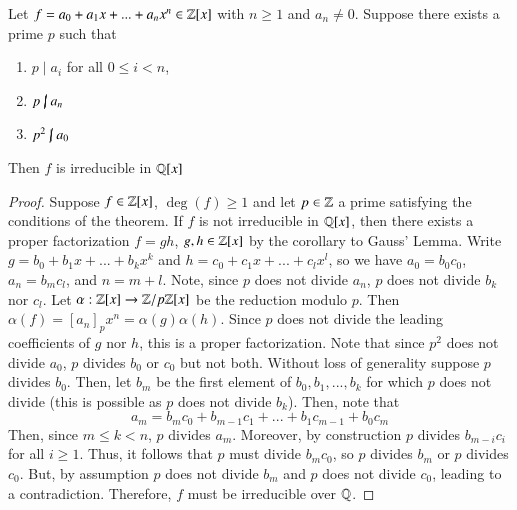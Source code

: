 \documentclass[12pt, a4paper, oneside, openright, titlepage]{book}
\begin{document}
\begin{namthm}
    Let $f = a_0+a_1x+...+a_nx^n \in \mathbb Z[x]$ with $n \geq 1$ and $a_n \neq 0$. Suppose there exists a prime $p$ such that \begin{enumerate}
        \item $p\;\vert\;a_i$ for all $0 \leq i < n$,
        \item $p\;\cancel{\vert}\;a_n$
        \item $p^2\;\cancel{\vert}\;a_0$
    \end{enumerate}
    Then $f$ is irreducible in $\mathbb Q[x]$
\end{namthm}
\begin{proof}
    Suppose $f \in \mathbb Z[x]$, $\deg(f) \geq 1$ and let $p \in \mathbb Z$ a prime satisfying the conditions of the theorem. If $f$ is not irreducible in $\mathbb Q[x]$, then there exists a proper factorization $f = gh$, $g,h \in \mathbb Z[x]$ by the corollary to Gauss' Lemma. Write $g = b_0+b_1x+...+b_kx^k$ and $h = c_0+c_1x+...+c_lx^l$, so we have $a_0 = b_0c_0$, $a_n = b_mc_l$, and $n = m+l$. Note, since $p$ does not divide $a_n$, $p$ does not divide $b_k$ nor $c_l$. Let $\alpha:\mathbb Z[x] \rightarrow \mathbb Z/p\mathbb Z[x]$ be the reduction modulo $p$. Then $\alpha(f) = [a_n]_px^n = \alpha(g)\alpha(h)$. Since $p$ does not divide the leading coefficients of $g$ nor $h$, this is a proper factorization. Note that since $p^2$ does not divide $a_0$, $p$ divides $b_0$ or $c_0$ but not both. Without loss of generality suppose $p$ divides $b_0$. Then, let $b_m$ be the first element of $b_0,b_1,...,b_k$ for which $p$ does not divide (this is possible as $p$ does not divide $b_k$). Then, note that $$a_m = b_mc_0 + b_{m-1}c_1 + ... + b_1c_{m-1} + b_0c_m$$ Then, since $m \leq k < n$, $p$ divides $a_m$. Moreover, by construction $p$ divides $b_{m-i}c_i$ for all $i \geq 1$. Thus, it follows that $p$ must divide $b_mc_0$, so $p$ divides $b_m$ or $p$ divides $c_0$. But, by assumption $p$ does not divide $b_m$ and $p$ does not divide $c_0$, leading to a contradiction. Therefore, $f$ must be irreducible over $\mathbb Q$.
\end{proof}
\end{document}
